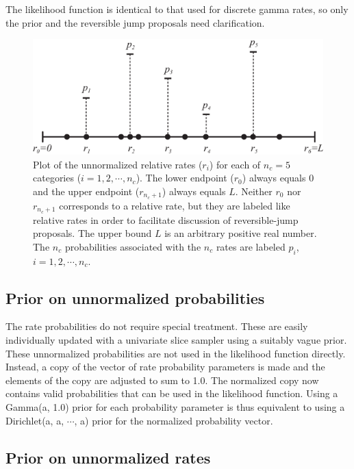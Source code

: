 \documentclass[12pt]{article}
\newcommand{\ncat}{n_c}
\begin{document}
The likelihood function is identical to that used for discrete gamma rates, so only the prior and the reversible jump proposals need clarification.   

%
%
\begin{figure}
\centering
\hfil\includegraphics[scale=0.7]{ratesprobs.eps}\hfil
\caption{Plot of the unnormalized relative rates ($r_i$) for each of $\ncat = 5$ categories ($i=1, 2, \cdots, \ncat$). The lower endpoint ($r_0$) always equals 0 and the upper endpoint ($r_{\ncat+1}$) always equals $L$. Neither $r_0$ nor $r_{\ncat+1}$ corresponds to a relative rate, but they are labeled like relative rates in order to facilitate discussion of reversible-jump proposals. The upper bound $L$ is an arbitrary positive real number. The $\ncat$ probabilities associated with the $\ncat$ rates are labeled $p_i$, $i=1,2,\cdots,\ncat$.}
\label{ratesprobs}
\end{figure}

\subsection{Prior on unnormalized probabilities}

The rate probabilities do not require special treatment. These are easily individually updated with a univariate slice sampler \citep{Neal2003a} using a suitably vague prior. These unnormalized probabilities are not used in the likelihood function directly. Instead, a copy of the vector of rate probability parameters is made and the elements of the copy are adjusted to sum to 1.0. The normalized copy now contains valid probabilities that can be used in the likelihood function. Using a Gamma(a, 1.0) prior for each probability parameter is thus equivalent to using a Dirichlet(a, a, $\cdots$, a) prior for the normalized probability vector.

\subsection{Prior on unnormalized rates}
\end{document}
